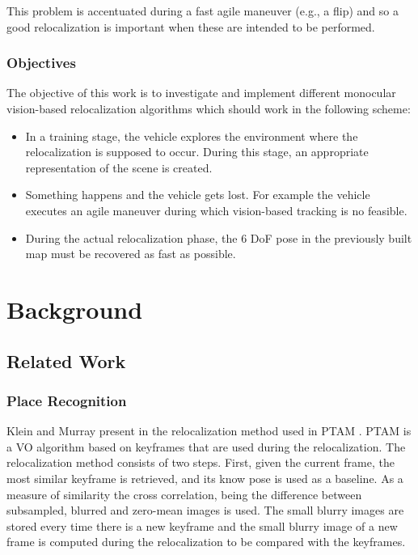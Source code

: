 This problem is accentuated during a fast  agile maneuver (e.g., a flip) and so a good relocalization is important when these are intended to be performed. \\

\subsection{Objectives}
\label{sub:objectives}

The objective of this work is to investigate and implement different monocular vision-based relocalization algorithms which should work in the following scheme:

\begin{itemize}
  \item In a training stage, the vehicle explores the environment where the relocalization is supposed to occur. During this stage, an appropriate representation of the scene is created. 
  \item Something happens and the vehicle gets lost. For example the vehicle executes an agile maneuver during which vision-based tracking is no feasible.
  \item During the actual relocalization phase, the 6 DoF pose in  the previously built map must be recovered as fast as possible.
\end{itemize}

\chapter{Background}
\label{cha:background}


\section{Related Work}\label{sec:related_work}

\subsection{Place Recognition}
\label{ssub:place_recognition}


Klein and Murray present in \cite{Klein2008improving} the relocalization method used in PTAM \cite{KleinMurray2007}. PTAM is a VO algorithm based on keyframes that are used during the relocalization. The relocalization method consists of two steps. First, given the current frame, the most similar keyframe is retrieved, and its know pose is used as a baseline. As a measure of similarity the cross correlation, being the difference between subsampled, blurred and zero-mean images is used. The small blurry images are stored every time there is a new keyframe and the small blurry image of a new frame is computed during the relocalization to be compared with the keyframes.\\

